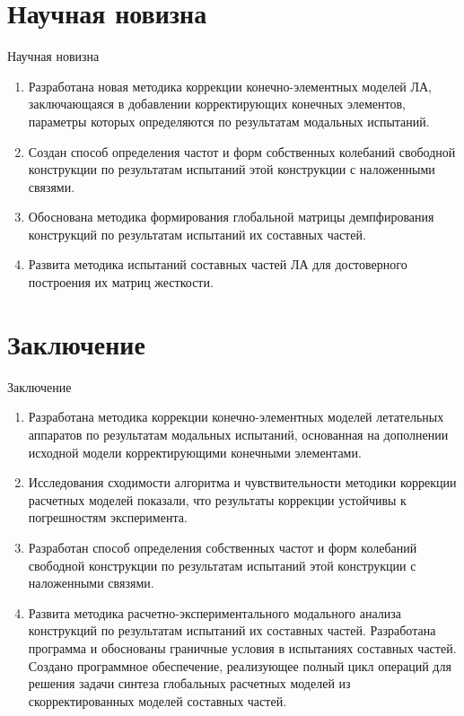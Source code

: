 
\section{Научная новизна}

\begin{frame}{Научная новизна}
	\begin{enumerate}
		\item Разработана новая методика коррекции конечно-элементных моделей ЛА, заключающаяся в добавлении корректирующих конечных элементов, параметры которых определяются по результатам модальных испытаний.
		\item Создан способ определения частот и форм собственных колебаний свободной конструкции по результатам испытаний этой конструкции с наложенными связями.
		\item Обоснована методика формирования глобальной матрицы демпфирования конструкций по результатам испытаний их составных частей.
		\item Развита методика испытаний составных частей ЛА для достоверного построения их матриц жесткости.
	\end{enumerate}
\end{frame}

\section{Заключение}

\begin{frame}{Заключение}
	\begin{enumerate}
		\item Разработана методика коррекции конечно-элементных моделей летательных аппаратов по результатам модальных испытаний, основанная на дополнении исходной модели корректирующими конечными элементами.
		\item Исследования сходимости алгоритма и чувствительности методики коррекции расчетных моделей показали, что результаты коррекции устойчивы к погрешностям эксперимента. 
		\item Разработан способ определения собственных частот и форм колебаний свободной конструкции по результатам испытаний этой конструкции с наложенными связями.
		\item Развита методика расчетно-экспериментального модального анализа конструкций по результатам испытаний их составных частей. Разработана программа и обоснованы граничные условия в испытаниях составных частей. Создано программное обеспечение, реализующее полный цикл операций для решения задачи синтеза глобальных расчетных моделей из скорректированных моделей составных частей.
	\end{enumerate}
\end{frame}

